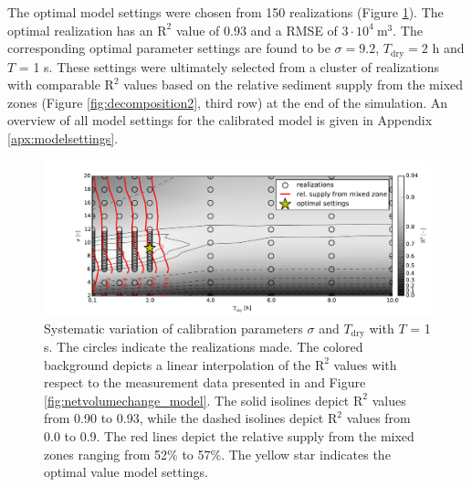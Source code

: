 The optimal model settings were chosen from 150 realizations (Figure
\ref{fig:calibration}). The optimal realization has an $\mathrm{R^2}$
value of 0.93 and a RMSE of $3 \cdot 10^4 ~ \mathrm{m^3}$.
The corresponding optimal parameter settings are found to be
$\sigma = 9.2$, $T_{\mathrm{dry}} = 2$ h and $T$ = 1 s. These
settings were ultimately selected from a cluster of realizations with
comparable $\mathrm{R^2}$ values based on the relative sediment supply
from the mixed zones (Figure \ref{fig:decomposition2}, third row) at
the end of the simulation. An overview of all model settings for the
calibrated model is given in Appendix \ref{apx:modelsettings}.

\begin{figure}
  \centering
  \includegraphics[width=\columnwidth]{../Figures/calibration}
  \caption{Systematic variation of calibration parameters $\sigma$ and
    $T_{\mathrm{dry}}$ with $T$ = 1 s. The circles indicate the
    realizations made. The colored background depicts a linear
    interpolation of the $\mathrm{R^2}$ values with respect to the
    measurement data presented in \citet{Hoonhout2017a} and Figure
    \ref{fig:netvolumechange_model}. The solid isolines depict
    $\mathrm{R}^2$ values from 0.90 to 0.93, while the dashed isolines
    depict $\mathrm{R}^2$ values from 0.0 to 0.9. The red lines depict
    the relative supply from the mixed zones ranging from 52\% to
    57\%. The yellow star indicates the optimal value model settings.}
  \label{fig:calibration}
\end{figure}

